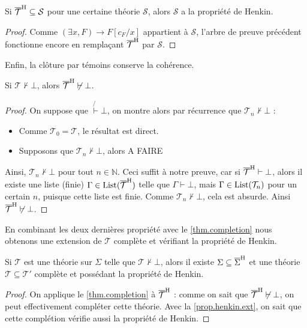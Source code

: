 \begin{property}\label{prop.henkin.ext}
  Si $\overline{\mathcal T}^{\mathrm H}\subseteq \mathcal S$ pour une certaine théorie
  $\mathcal S$, alors $\mathcal S$ a la propriété de Henkin.
\end{property}

\begin{proof}
  Comme $(\exists x,F)\to F[c_F/x]$ appartient à $\mathcal S$, l'arbre de preuve
  précédent fonctionne encore en remplaçant $\overline{\mathcal T}^{\mathrm H}$ par
  $\mathcal S$.
\end{proof}

Enfin, la clôture par témoins conserve la cohérence.

\begin{property}
  Si $\mathcal T\not\vdash \bot$, alors $\overline{\mathcal T}^{\mathrm H}\not\vdash\bot$.
\end{property}

\begin{proof}
  On suppose que $\mathcal \not\vdash\bot$, on montre alors par récurrence que
  $\mathcal T_n\not\vdash\bot$ :
  \begin{itemize}
  \item Comme $\mathcal T_0 =\mathcal T$, le résultat est direct.
  \item Supposons que $\mathcal T_n\not\vdash\bot$, alors A FAIRE
  \end{itemize}

  Ainsi, $\mathcal T_n\not\vdash\bot$ pour tout $n\in \mathbb N$. Ceci suffit à
  notre preuve, car si $\overline{\mathcal T}^{\mathrm H}\vdash \bot$, alors il existe une
  liste (finie) $\Gamma\in\operatorname{List}(\overline{\mathcal T}^{\mathrm H})$ telle que
  $\Gamma\vdash\bot$, mais $\Gamma\in\operatorname{List}(\mathcal T_n)$ pour un certain $n$,
  puisque cette liste est finie. Comme $\mathcal T_n\not\vdash\bot$, cela est
  absurde. Ainsi $\overline{\mathcal T}^{\mathrm H}\not\vdash\bot$.
\end{proof}

En combinant les deux dernières propriété avec le \cref{thm.completion} nous
obtenons une extension de $\mathcal T$ complète et vérifiant la propriété de
Henkin.

\begin{lemma}
  Si $\mathcal T$ est une théorie sur $\Sigma$ telle que
  $\mathcal T\not\vdash\bot$, alors il existe $\Sigma\subseteq\overline{\Sigma}^{\mathrm H}$ et
  une théorie $\mathcal T\subseteq\mathcal T'$ complète et possédant la propriété
  de Henkin.
\end{lemma}

\begin{proof}
  On applique le \cref{thm.completion} à $\overline{\mathcal T}^{\mathrm H}$ : comme on sait
  que $\overline{\mathcal T}^{\mathrm H}\not\vdash\bot$, on peut effectivement compléter cette
  théorie. Avec la \cref{prop.henkin.ext}, on sait que cette complétion vérifie
  aussi la propriété de Henkin.
\end{proof}

